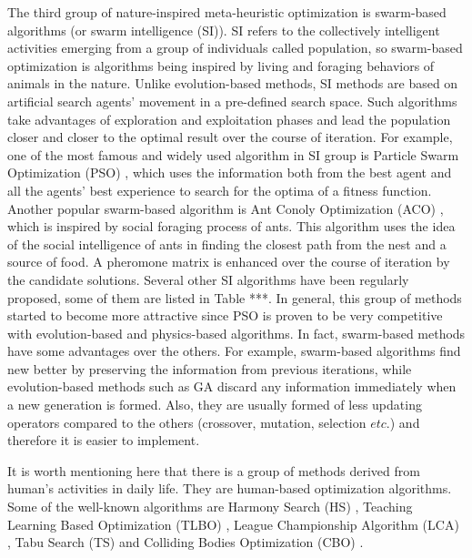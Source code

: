 \documentclass[a4paper,13pt,2p]{report}
\begin{document}
	The third group of nature-inspired meta-heuristic optimization is swarm-based algorithms (or swarm intelligence (SI)). SI refers to the collectively intelligent activities emerging from a group of individuals called population, so swarm-based optimization is algorithms being inspired by living and foraging behaviors of animals in the nature. Unlike evolution-based methods, SI methods are based on artificial search agents' movement in a pre-defined search space. Such algorithms take advantages of exploration and exploitation phases and lead the population closer and closer to the optimal result over the course of iteration. For example, one of the most famous and widely used algorithm in SI group is Particle Swarm Optimization (PSO) \cite{eberhart1995particle}, which uses the information both from the best agent and all the agents' best experience to search for the optima of a fitness function. Another popular swarm-based algorithm is Ant Conoly Optimization (ACO) \cite{dorigo1999ant}, which is inspired by social foraging process of ants. This algorithm uses the idea of the social intelligence of ants in finding the closest path from the nest and a source of food. A pheromone matrix is
enhanced over the course of iteration by the candidate solutions.  Several other SI algorithms have been regularly proposed, some of them are listed in Table ***. In general, this group of methods started to become more attractive since PSO is proven to be very competitive with evolution-based and physics-based algorithms. In fact, swarm-based methods have some advantages over the others. For example, swarm-based algorithms find new better by preserving the information from previous iterations, while evolution-based methods such as GA discard any information immediately when a new generation is formed. Also, they are usually formed of less updating operators compared to the others (crossover, mutation, selection $etc.$) and therefore it is easier to implement.

	It is worth mentioning here that there is a group of methods derived from human's activities in daily life. They are human-based optimization algorithms. Some of the well-known algorithms are Harmony Search (HS) \cite{geem2001new}, Teaching Learning Based Optimization (TLBO) \cite{ao2011teaching}, League Championship Algorithm (LCA) \cite{kashan2014league}, Tabu Search (TS) \cite{de1989tabu} and Colliding Bodies Optimization (CBO) \cite{kaveh2014colliding}. 
	
	
\end{document}
